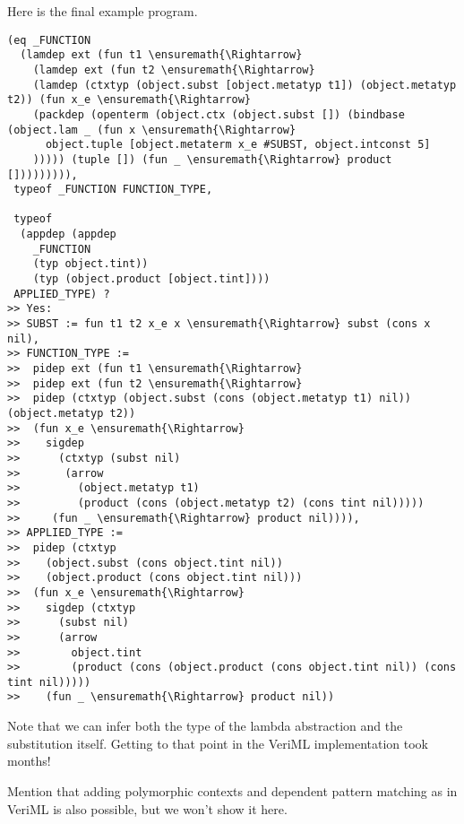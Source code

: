 Here is the final example program.

\begin{verbatim}
(eq _FUNCTION
  (lamdep ext (fun t1 \ensuremath{\Rightarrow}
    (lamdep ext (fun t2 \ensuremath{\Rightarrow}
    (lamdep (ctxtyp (object.subst [object.metatyp t1]) (object.metatyp t2)) (fun x_e \ensuremath{\Rightarrow}
    (packdep (openterm (object.ctx (object.subst []) (bindbase (object.lam _ (fun x \ensuremath{\Rightarrow}
      object.tuple [object.metaterm x_e #SUBST, object.intconst 5]
    ))))) (tuple []) (fun _ \ensuremath{\Rightarrow} product [])))))))),
 typeof _FUNCTION FUNCTION_TYPE,

 typeof 
  (appdep (appdep 
    _FUNCTION 
    (typ object.tint)) 
    (typ (object.product [object.tint])))
 APPLIED_TYPE) ?
>> Yes:
>> SUBST := fun t1 t2 x_e x \ensuremath{\Rightarrow} subst (cons x nil),
>> FUNCTION_TYPE :=
>>  pidep ext (fun t1 \ensuremath{\Rightarrow}
>>  pidep ext (fun t2 \ensuremath{\Rightarrow}
>>  pidep (ctxtyp (object.subst (cons (object.metatyp t1) nil)) (object.metatyp t2))
>>  (fun x_e \ensuremath{\Rightarrow}
>>    sigdep 
>>      (ctxtyp (subst nil) 
>>       (arrow
>>         (object.metatyp t1)
>>         (product (cons (object.metatyp t2) (cons tint nil)))))
>>     (fun _ \ensuremath{\Rightarrow} product nil)))),
>> APPLIED_TYPE :=
>>  pidep (ctxtyp
>>    (object.subst (cons object.tint nil))
>>    (object.product (cons object.tint nil)))
>>  (fun x_e \ensuremath{\Rightarrow}
>>    sigdep (ctxtyp
>>      (subst nil)
>>      (arrow
>>        object.tint
>>        (product (cons (object.product (cons object.tint nil)) (cons tint nil)))))
>>    (fun _ \ensuremath{\Rightarrow} product nil))
\end{verbatim}

Note that we can infer both the type of the lambda abstraction and the
substitution itself. Getting to that point in the VeriML implementation
took months!

Mention that adding polymorphic contexts and dependent pattern matching
as in VeriML is also possible, but we won't show it here.
